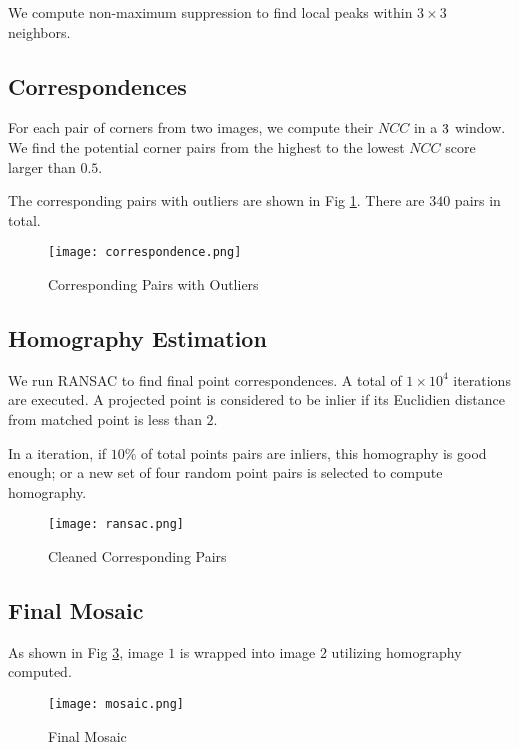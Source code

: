 \documentclass[letterpaper, 10 pt, conference]{ieeeconf}
\begin{document}
We compute non-maximum suppression to find local peaks within $3\times3$ neighbors.

\subsection{Correspondences}
For each pair of corners from two images, we compute their $NCC$ in a $3\time3$ window. We find the potential corner pairs from the highest to the lowest $NCC$ score larger than $0.5$.

The corresponding pairs with outliers are shown in Fig \ref{corr}. There are $340$ pairs in total.

\begin{figure}[thpb]
\centering
\texttt{[image: correspondence.png]}
\caption{Corresponding Pairs with Outliers}
\label{corr}
\end{figure}


\subsection{Homography Estimation}
We run RANSAC to find final point correspondences. A total of $1\times10^4$ iterations are executed. A projected point is considered to be inlier if its Euclidien distance from matched point is less than $2$.

\newpage

In a iteration, if $10\%$ of total points pairs are inliers, this homography is good enough; or a new set of four random point pairs is selected to compute homography.

\begin{figure}[thpb]
\centering
\texttt{[image: ransac.png]}
\caption{Cleaned Corresponding Pairs}
\label{clean}
\end{figure}

\subsection{Final Mosaic}
As shown in Fig \ref{mosaic}, image $1$ is wrapped into image 2 utilizing homography computed.

\begin{figure}[thpb]
\centering
\texttt{[image: mosaic.png]}
\caption{Final Mosaic}
\label{mosaic}
\end{figure}
\end{document}

